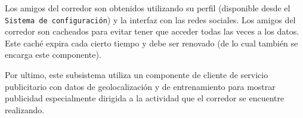Los amigos del corredor son obtenidos utilizando su perfil (disponible
desde el \texttt{Sistema de configuración}) y la interfaz con las
redes sociales. Los amigos del corredor son cacheados para evitar
tener que acceder todas las veces a los datos. Este caché expira cada
cierto tiempo y debe ser renovado (de lo cual también se encarga este
componente).

Por ultimo, este subsistema utiliza un componente de cliente de 
servicio publicitario con datos de geolocalización y de entrenamiento
para mostrar publicidad especialmente dirigida a la actividad que
el corredor se encuentre realizando.
